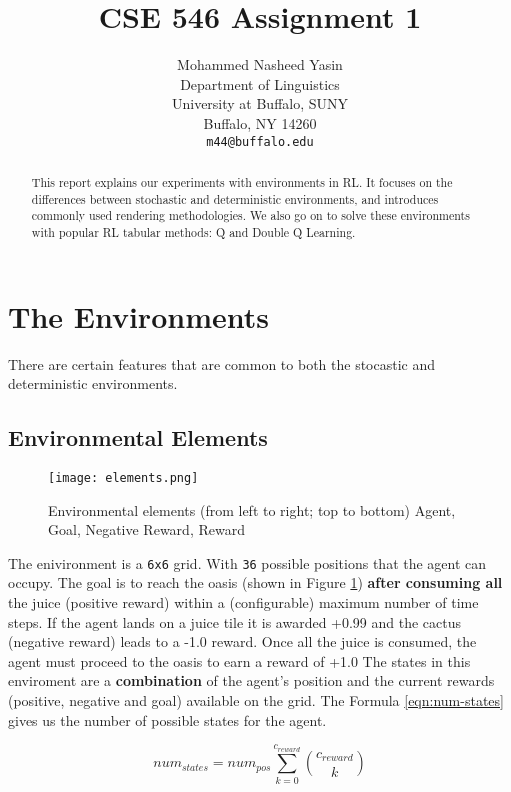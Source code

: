 \documentclass{article} %
\title{CSE 546 Assignment 1}
\author{
   Mohammed Nasheed Yasin \\
   Department of Linguistics\\
   University at Buffalo, SUNY\\
   Buffalo, NY 14260 \\
   \texttt{m44@buffalo.edu}
}
\begin{document}
\maketitle

\begin{abstract}
    This report explains our experiments with environments in RL.
    It focuses on the differences between stochastic and deterministic environments,
    and introduces commonly used rendering methodologies. We also go on to solve these
    environments with popular RL tabular methods: Q and Double Q Learning.
\end{abstract}

\section{The Environments}

There are certain features that are common to both the stocastic and deterministic environments.

\subsection*{Environmental Elements}
\begin{figure}[h]
    \begin{center}
        \texttt{[image: elements.png]}
    \end{center}
    \label{fig:elements}
    \caption{Environmental elements (from left to right; top to bottom) Agent, Goal,
        Negative Reward, Reward}
\end{figure}

The enivironment is a \verb|6x6| grid. With \verb|36| possible positions that the agent can
occupy. The goal is to reach the oasis (shown in Figure \ref{fig:elements}) \textbf{after
consuming all} the juice (positive reward) within a (configurable) maximum number of time
steps. If the agent lands on a juice tile it is awarded +0.99 and the cactus (negative
reward) leads to a -1.0 reward. Once all the juice is consumed, the agent must proceed to the
oasis to earn a reward of +1.0
The states in this enviroment are a \textbf{combination} of the agent's position and the
current rewards (positive, negative and goal) available on the grid. The Formula \ref{eqn:num-states}
gives us the number of possible states for the agent.

\begin{equation}
    num_{states}=num_{pos} \sum_{k=0}^{c_{reward}} {c_{reward}\choose k}
    \label{eqn:num-states}
\end{equation}
\end{document}
